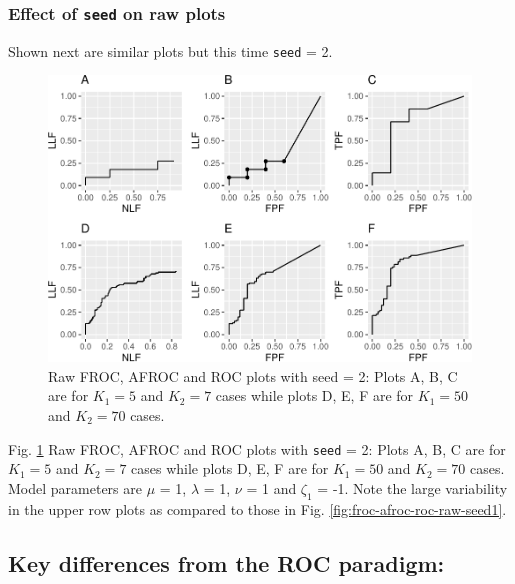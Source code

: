\documentclass[
]{book}
\begin{document}
\hypertarget{effect-of-seed-on-raw-plots}{%
\subsubsection{\texorpdfstring{Effect of \texttt{seed} on raw plots}{Effect of seed on raw plots}}\label{effect-of-seed-on-raw-plots}}

Shown next are similar plots but this time \texttt{seed} = 2.

\begin{figure}
\centering
\includegraphics{13b-froc-empirical2_files/figure-latex/froc-afroc-roc-raw-seed2-1.pdf}
\caption{\label{fig:froc-afroc-roc-raw-seed2}Raw FROC, AFROC and ROC plots with seed = 2: Plots A, B, C are for \(K_1 = 5\) and \(K_2 = 7\) cases while plots D, E, F are for \(K_1 = 50\) and \(K_2 = 70\) cases.}
\end{figure}

Fig. \ref{fig:froc-afroc-roc-raw-seed2} Raw FROC, AFROC and ROC plots with \texttt{seed} = 2: Plots A, B, C are for \(K_1 = 5\) and \(K_2 = 7\) cases while plots D, E, F are for \(K_1 = 50\) and \(K_2 = 70\) cases. Model parameters are \(\mu\) = 1, \(\lambda\) = 1, \(\nu\) = 1 and \(\zeta_1\) = -1. Note the large variability in the upper row plots as compared to those in Fig. \ref{fig:froc-afroc-roc-raw-seed1}.

\hypertarget{key-differences-from-the-roc-paradigm}{%
\subsection{Key differences from the ROC paradigm:}\label{key-differences-from-the-roc-paradigm}}
\end{document}
